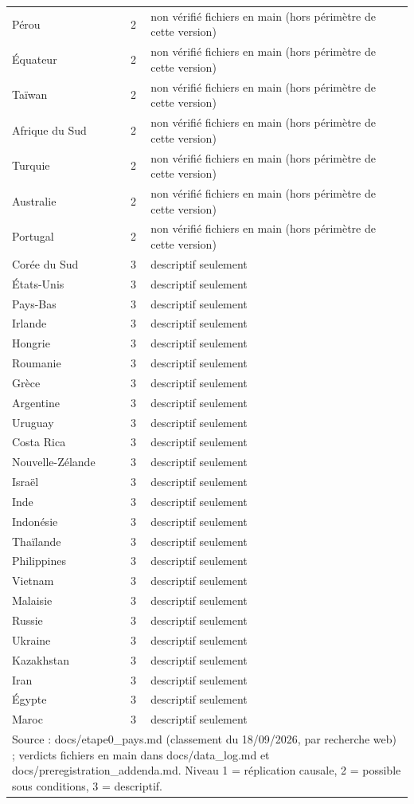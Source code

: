\begin{longtable}{lcp{7.5cm}}
Pérou & 2 & non vérifié fichiers en main (hors périmètre de cette version) \\
Équateur & 2 & non vérifié fichiers en main (hors périmètre de cette version) \\
Taïwan & 2 & non vérifié fichiers en main (hors périmètre de cette version) \\
Afrique du Sud & 2 & non vérifié fichiers en main (hors périmètre de cette version) \\
Turquie & 2 & non vérifié fichiers en main (hors périmètre de cette version) \\
Australie & 2 & non vérifié fichiers en main (hors périmètre de cette version) \\
Portugal & 2 & non vérifié fichiers en main (hors périmètre de cette version) \\
Corée du Sud & 3 & descriptif seulement \\
États-Unis & 3 & descriptif seulement \\
Pays-Bas & 3 & descriptif seulement \\
Irlande & 3 & descriptif seulement \\
Hongrie & 3 & descriptif seulement \\
Roumanie & 3 & descriptif seulement \\
Grèce & 3 & descriptif seulement \\
Argentine & 3 & descriptif seulement \\
Uruguay & 3 & descriptif seulement \\
Costa Rica & 3 & descriptif seulement \\
Nouvelle-Zélande & 3 & descriptif seulement \\
Israël & 3 & descriptif seulement \\
Inde & 3 & descriptif seulement \\
Indonésie & 3 & descriptif seulement \\
Thaïlande & 3 & descriptif seulement \\
Philippines & 3 & descriptif seulement \\
Vietnam & 3 & descriptif seulement \\
Malaisie & 3 & descriptif seulement \\
Russie & 3 & descriptif seulement \\
Ukraine & 3 & descriptif seulement \\
Kazakhstan & 3 & descriptif seulement \\
Iran & 3 & descriptif seulement \\
Égypte & 3 & descriptif seulement \\
Maroc & 3 & descriptif seulement \\
\bottomrule
\multicolumn{3}{p{12.2cm}}{\footnotesize Source : docs/etape0\_pays.md (classement du 18/09/2026, par recherche web) ; verdicts fichiers en main dans docs/data\_log.md et docs/preregistration\_addenda.md. Niveau 1 = réplication causale, 2 = possible sous conditions, 3 = descriptif.}
\end{longtable}
